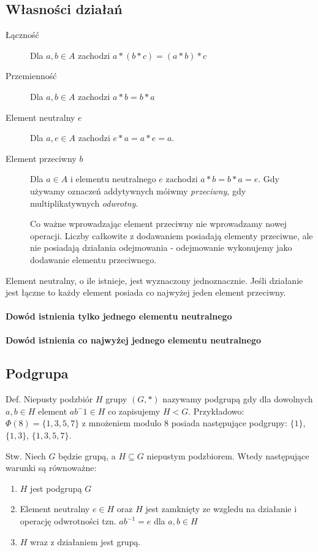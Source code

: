 \documentclass{report}
\begin{document}
\subsection{Własności działań}

\begin{description}
\item[Łączność] Dla $a, b \in A$ zachodzi $a * (b * c) = (a * b) * c$
\item[Przemienność] Dla $a, b \in A$ zachodzi $a * b = b * a$
\item[Element neutralny $e$] Dla $a, e \in A$ zachodzi $e * a = a * e = a$.
\item[Element przeciwny $b$] Dla $a \in A$ i elementu neutralnego $e$ zachodzi $a * b = b * a = e$. Gdy używamy oznaczeń addytywnych móiwmy \textit{przeciwny}, gdy multiplikatywnych \textit{odwrotny}.

Co ważne wprowadzając element przeciwny nie wprowadzamy nowej operacji. Liczby całkowite z dodawaniem posiadają elementy przeciwne, ale nie posiadają działania odejmowania - odejmowanie wykonujemy jako dodawanie elementu przeciwnego.
\end{description}

Element neutralny, o ile istnieje, jest wyznaczony jednoznacznie. Jeśli działanie jest łączne to każdy element posiada co najwyżej jeden element przeciwny.

\paragraph{Dowód istnienia tylko jednego elementu neutralnego}


\paragraph{Dowód istnienia co najwyżej jednego elementu neutralnego}


\subsection{Podgrupa}

Def.
Niepusty podzbiór $H$ grupy $(G, *)$ nazywamy podgrupą gdy dla dowolnych $a, b \in H$ element $ab^-1 \in H$ co zapisujemy $H < G$. Przykładowo: $ \Phi(8) = \{ 1, 3, 5, 7 \} $ z mnożeniem modulo 8 posiada następujące podgrupy: $\{1\}$, $\{1,3\}$, $\{1,3,5,7\}$.

Stw. Niech $G$ będzie grupą, a $H \subseteq G$ niepustym podzbiorem. Wtedy następujące warunki są równoważne:
\begin{enumerate}
\item $H$ jest podgrupą $G$
\item Element neutralny $e \in H$ oraz $H$ jest zamknięty ze wzgledu na działanie i operację odwrotności tzn. $ab^{-1} = e$ dla $a,b \in H$
\item $H$ wraz z działaniem jest grupą.
\end{enumerate}
\end{document}
